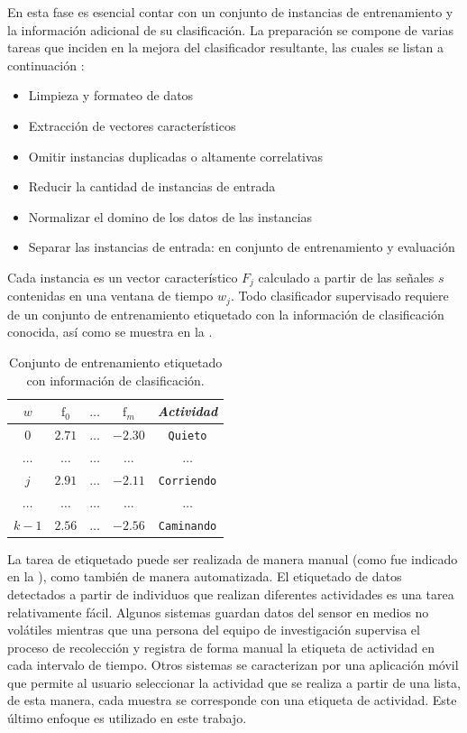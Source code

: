 En esta fase es esencial contar con un conjunto de instancias de entrenamiento
y la información adicional de su clasificación. La preparación se
compone de varias tareas que inciden en la mejora del clasificador
resultante, las cuales se listan a continuación \cite{Raschka2014}:
\begin{itemize}
\item Limpieza y formateo de datos
\item Extracción de vectores característicos
\item Omitir instancias duplicadas o altamente correlativas
\item Reducir la cantidad de instancias de entrada
\item Normalizar el domino de los datos de las instancias
\item Separar las instancias de entrada: en conjunto de entrenamiento y
evaluación
\end{itemize}
Cada instancia es un vector característico $F_{j}$ calculado a partir
de las señales $s$ contenidas en una ventana de tiempo $w_{j}$.
Todo clasificador supervisado requiere de un conjunto de entrenamiento
etiquetado con la información de clasificación conocida, así como
se muestra en la . 

\begin{table}[!tbph]
\begin{centering}
\begin{tabular}{|c|c|c|c|c|}
\hline 
$w$ & $\mathrm{f}_{0}$ & $\ldots$ & $\mathrm{f}_{m}$ & \emph{Actividad}\tabularnewline
\hline 
\hline 
$0$ & $2.71$ & \texttt{$\ldots$} & \texttt{$-2.30$} & \texttt{\small{}Quieto}\tabularnewline
\hline 
$\ldots$ & $\ldots$ & \texttt{$\ldots$} & \texttt{$\ldots$} & \texttt{$\ldots$}\tabularnewline
\hline 
$j$ & $2.91$ & \texttt{$\ldots$} & \texttt{$-2.11$} & \texttt{\small{}Corriendo}\tabularnewline
\hline 
$\ldots$ & $\ldots$ & \texttt{$\ldots$} & \texttt{$\ldots$} & \texttt{$\ldots$}\tabularnewline
\hline 
$k-1$ & $2.56$ & \texttt{$\ldots$} & \texttt{$-2.56$} & \texttt{\small{}Caminando}\tabularnewline
\hline 
\end{tabular}
\par\end{centering}
\caption[Instancias etiquetadas]{\label{tab4:labeled}Conjunto de entrenamiento etiquetado con información
de clasificación.}
\end{table}

La tarea de etiquetado puede ser realizada de manera manual (como
fue indicado en la ), como también de manera
automatizada. El etiquetado de datos detectados a partir de individuos
que realizan diferentes actividades es una tarea relativamente fácil.
Algunos sistemas guardan datos del sensor en medios no volátiles mientras
que una persona del equipo de investigación supervisa el proceso de
recolección y registra de forma manual la etiqueta de actividad en
cada intervalo de tiempo. Otros sistemas se caracterizan por una aplicación
móvil que permite al usuario seleccionar la actividad que se realiza
a partir de una lista, de esta manera, cada muestra se corresponde
con una etiqueta de actividad. Este último enfoque es utilizado en
este trabajo.

